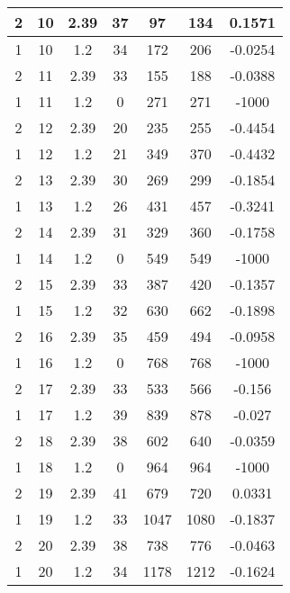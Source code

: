 \documentclass[letterpaper, 12pt]{article}
\begin{document}
\begin{longtable}{|c|c|c|c|c|c|c|}
\hline
2 & 10 & 2.39 & 37 & 97 & 134 & 0.1571 \\
\hline
1 & 10 & 1.2 & 34 & 172 & 206 & -0.0254 \\
\hline
2 & 11 & 2.39 & 33 & 155 & 188 & -0.0388 \\
\hline
1 & 11 & 1.2 & 0 & 271 & 271 & -1000 \\
\hline
2 & 12 & 2.39 & 20 & 235 & 255 & -0.4454 \\
\hline
1 & 12 & 1.2 & 21 & 349 & 370 & -0.4432 \\
\hline
2 & 13 & 2.39 & 30 & 269 & 299 & -0.1854 \\
\hline
1 & 13 & 1.2 & 26 & 431 & 457 & -0.3241 \\
\hline
2 & 14 & 2.39 & 31 & 329 & 360 & -0.1758 \\
\hline
1 & 14 & 1.2 & 0 & 549 & 549 & -1000 \\
\hline
2 & 15 & 2.39 & 33 & 387 & 420 & -0.1357 \\
\hline
1 & 15 & 1.2 & 32 & 630 & 662 & -0.1898 \\
\hline
2 & 16 & 2.39 & 35 & 459 & 494 & -0.0958 \\
\hline
1 & 16 & 1.2 & 0 & 768 & 768 & -1000 \\
\hline
2 & 17 & 2.39 & 33 & 533 & 566 & -0.156 \\
\hline
1 & 17 & 1.2 & 39 & 839 & 878 & -0.027 \\
\hline
2 & 18 & 2.39 & 38 & 602 & 640 & -0.0359 \\
\hline
1 & 18 & 1.2 & 0 & 964 & 964 & -1000 \\
\hline
2 & 19 & 2.39 & 41 & 679 & 720 & 0.0331 \\
\hline
1 & 19 & 1.2 & 33 & 1047 & 1080 & -0.1837 \\
\hline
2 & 20 & 2.39 & 38 & 738 & 776 & -0.0463 \\
\hline
1 & 20 & 1.2 & 34 & 1178 & 1212 & -0.1624 \\
\hline
\end{longtable}
\end{document}

